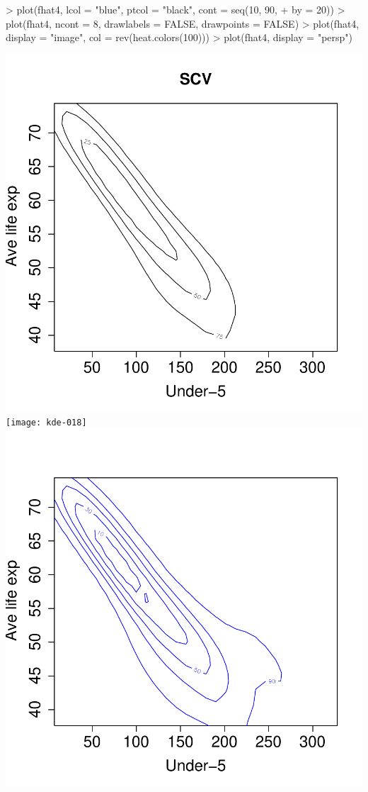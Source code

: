 \documentclass[a4paper,11pt]{article}
\begin{document}
\begin{Schunk}
\begin{Sinput}
> plot(fhat4, lcol = "blue", ptcol = "black", cont = seq(10, 90, 
+     by = 20))
> plot(fhat4, ncont = 8, drawlabels = FALSE, drawpoints = FALSE)
> plot(fhat4, display = "image", col = rev(heat.colors(100)))
> plot(fhat4, display = "persp")
\end{Sinput}
\end{Schunk}
\begin{center}
\includegraphics{kde-017}
\texttt{[image: kde-018]}
\includegraphics{kde-019}

\end{center}
\end{document}
